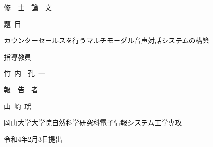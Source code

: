 \pagestyle{empty}

\begin{titlepage}

\vspace*{1cm}

\begin{center}


修\ \ 士\ \ 論\ \ 文

\vspace*{0.8cm}

題\ 目

\vspace*{1cm}

{\large{カウンターセールスを行うマルチモーダル音声対話システムの構築}}


\vspace*{-0.3cm}

\underline{\hspace*{12cm}}

\vspace*{3cm}

指導教員

\vspace*{0.3cm}

{\large{竹~内~~孔~一}}

\vspace*{-0.3cm}

\underline{\hspace*{4cm}}

\vspace*{3cm}

報~~告~~者

\vspace*{0.3cm}

{\large{山~崎~瑶}}

\vspace*{-0.3cm}

\underline{\hspace*{4cm}}

\vspace*{0.5cm}

岡山大学大学院自然科学研究科電子情報システム工学専攻

\vspace*{2cm}

令和4年2月3日提出





\end{center}
\end{titlepage}
\newpage
